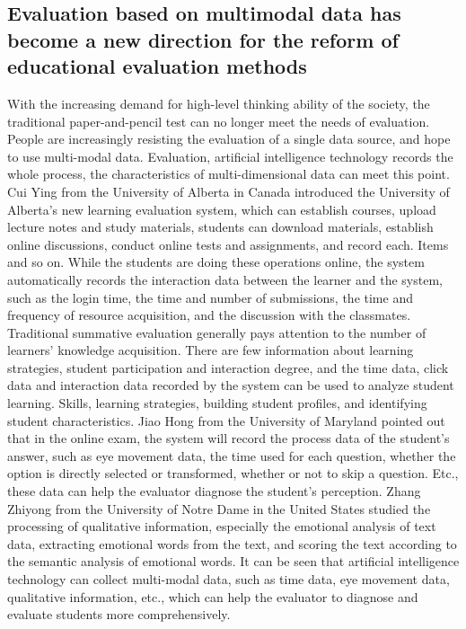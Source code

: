 \documentclass[11pt,en,authoryear]{elegantpaper}
\begin{document}
\subsection{Evaluation based on multimodal data has become a new direction for the reform of educational evaluation methods}
With the increasing demand for high-level thinking ability of the society, the traditional paper-and-pencil test can no longer meet the needs of evaluation. People are increasingly resisting the evaluation of a single data source, and hope to use multi-modal data. Evaluation, artificial intelligence technology records the whole process, the characteristics of multi-dimensional data can meet this point. Cui Ying from the University of Alberta in Canada introduced the University of Alberta's new learning evaluation system, which can establish courses, upload lecture notes and study materials, students can download materials, establish online discussions, conduct online tests and assignments, and record each. Items and so on. While the students are doing these operations online, the system automatically records the interaction data between the learner and the system, such as the login time, the time and number of submissions, the time and frequency of resource acquisition, and the discussion with the classmates. Traditional summative evaluation generally pays attention to the number of learners' knowledge acquisition. There are few information about learning strategies, student participation and interaction degree, and the time data, click data and interaction data recorded by the system can be used to analyze student learning. Skills, learning strategies, building student profiles, and identifying student characteristics. Jiao Hong from the University of Maryland pointed out that in the online exam, the system will record the process data of the student's answer, such as eye movement data, the time used for each question, whether the option is directly selected or transformed, whether or not to skip a question. Etc., these data can help the evaluator diagnose the student's perception. Zhang Zhiyong from the University of Notre Dame in the United States studied the processing of qualitative information, especially the emotional analysis of text data, extracting emotional words from the text, and scoring the text according to the semantic analysis of emotional words. It can be seen that artificial intelligence technology can collect multi-modal data, such as time data, eye movement data, qualitative information, etc., which can help the evaluator to diagnose and evaluate students more comprehensively.
\end{document}
